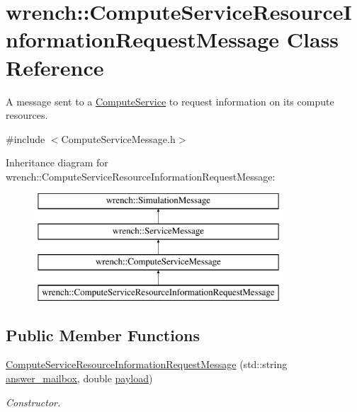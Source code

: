 \hypertarget{classwrench_1_1_compute_service_resource_information_request_message}{}\section{wrench\+:\+:Compute\+Service\+Resource\+Information\+Request\+Message Class Reference}
\label{classwrench_1_1_compute_service_resource_information_request_message}


A message sent to a \hyperlink{classwrench_1_1_compute_service}{Compute\+Service} to request information on its compute resources.  




{\ttfamily \#include $<$Compute\+Service\+Message.\+h$>$}

Inheritance diagram for wrench\+:\+:Compute\+Service\+Resource\+Information\+Request\+Message\+:\begin{figure}[H]
\begin{center}
\leavevmode
\includegraphics[height=4.000000cm]{classwrench_1_1_compute_service_resource_information_request_message}
\end{center}
\end{figure}
\subsection*{Public Member Functions}
\begin{DoxyCompactItemize}
\item 
\hyperlink{classwrench_1_1_compute_service_resource_information_request_message_a34d1049ce5cde842eeeff22754f1c588}{Compute\+Service\+Resource\+Information\+Request\+Message} (std\+::string \hyperlink{classwrench_1_1_compute_service_resource_information_request_message_aa8d94abdd5a100f2749c0ca1d58881da}{answer\+\_\+mailbox}, double \hyperlink{classwrench_1_1_simulation_message_a914f2732713f7c02898e66f05a7cb8a1}{payload})
\begin{DoxyCompactList}\small\item\em Constructor. \end{DoxyCompactList}\end{DoxyCompactItemize}
